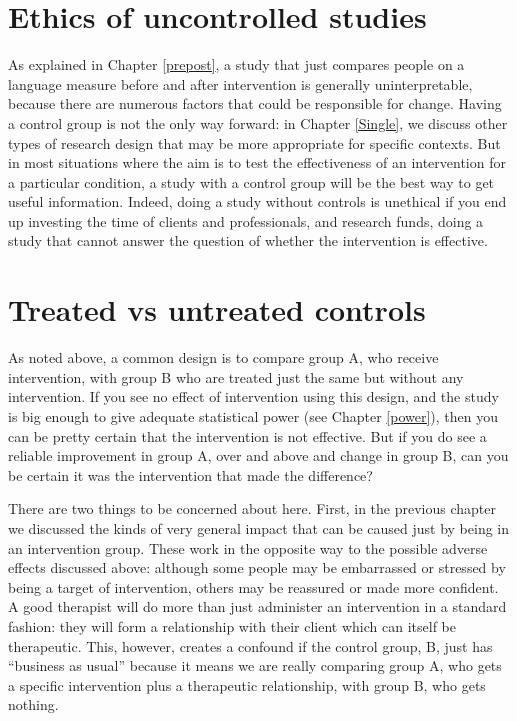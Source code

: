 \documentclass{krantz}
\begin{document}
\hypertarget{ethics-of-uncontrolled-studies}{%
\section{Ethics of uncontrolled studies}\label{ethics-of-uncontrolled-studies}}

As explained in Chapter \ref{prepost}, a study that just compares people on a language measure before and after intervention is generally uninterpretable, because there are numerous factors that could be responsible for change. Having a control group is not the only way forward: in Chapter \ref{Single}, we discuss other types of research design that may be more appropriate for specific contexts. But in most situations where the aim is to test the effectiveness of an intervention for a particular condition, a study with a control group will be the best way to get useful information. Indeed, doing a study without controls is unethical if you end up investing the time of clients and professionals, and research funds, doing a study that cannot answer the question of whether the intervention is effective.

\hypertarget{treated-vs-untreated-controls}{%
\section{Treated vs untreated controls}\label{treated-vs-untreated-controls}}

As noted above, a common design is to compare group A, who receive intervention, with group B who are treated just the same but without any intervention. If you see no effect of intervention using this design, and the study is big enough to give adequate statistical power (see Chapter \ref{power}), then you can be pretty certain that the intervention is not effective. But if you do see a reliable improvement in group A, over and above and change in group B, can you be certain it was the intervention that made the difference?

There are two things to be concerned about here. First, in the previous chapter we discussed the kinds of very general impact that can be caused just by being in an intervention group. These work in the opposite way to the possible adverse effects discussed above: although some people may be embarrassed or stressed by being a target of intervention, others may be reassured or made more confident. A good therapist will do more than just administer an intervention in a standard fashion: they will form a relationship with their client which can itself be therapeutic. This, however, creates a confound if the control group, B, just has ``business as usual'' because it means we are really comparing group A, who gets a specific intervention plus a therapeutic relationship, with group B, who gets nothing.
\end{document}
